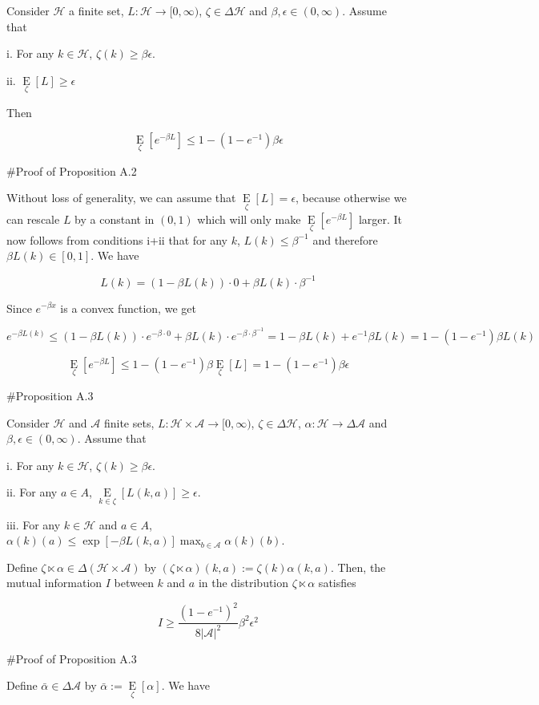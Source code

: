 \documentclass[a4paper]{article}
\newcommand{\E}[1]{\underset{#1}{\operatorname{E}}}
\newcommand{\Abs}[1]{\lvert #1 \rvert}
\newcommand{\A}{\mathcal{A}}
\newcommand{\Hy}{\mathcal{H}}
\begin{document}
Consider $\Hy$ a finite set, $L: \Hy \rightarrow [0,\infty)$, $\zeta \in \Delta\Hy$ and $\beta,\epsilon \in (0,\infty)$. Assume that

i. For any $k \in \Hy$, $\zeta(k) \geq \beta\epsilon$.

ii. $\E{\zeta}[L] \geq \epsilon$

Then

$$\E{\zeta}[e^{-\beta L}] \leq 1 - (1 - e^{-1})\beta\epsilon$$

\#Proof of Proposition A.2

Without loss of generality, we can assume that $\E\zeta[L] = \epsilon$, because otherwise we can rescale $L$ by a constant in $(0,1)$ which will only make $\E{\zeta}[e^{-\beta L}]$ larger. It now follows from conditions i+ii that for any $k$, $L(k) \leq \beta^{-1}$ and therefore $\beta L(k) \in [0,1]$. We have

$$L(k) = (1 - \beta L(k)) \cdot 0 + \beta L(k) \cdot \beta^{-1}$$

Since $e^{-\beta x}$ is a convex function, we get

$$e^{-\beta L(k)} \leq (1 - \beta L(k)) \cdot e^{-\beta \cdot 0} + \beta L(k) \cdot e^{-\beta \cdot \beta^{-1}} = 1 - \beta L(k) + e^{-1} \beta L(k) = 1-(1-e^{-1})\beta L(k)$$

$$\E\zeta[e^{-\beta L}] \leq 1-(1-e^{-1})\beta \E\zeta[L] = 1-(1-e^{-1})\beta\epsilon$$

\#Proposition A.3

Consider $\Hy$ and $\A$ finite sets, $L: \Hy \times \A \rightarrow [0,\infty)$, $\zeta \in \Delta\Hy$, $\alpha: \Hy \rightarrow \Delta\A$ and $\beta,\epsilon \in (0,\infty)$. Assume that

i. For any $k \in \Hy$, $\zeta(k) \geq \beta\epsilon$.

ii. For any $a \in A$, $\E{k \in \zeta}[L(k,a)] \geq \epsilon$.

iii. For any $k \in \Hy$ and $a \in A$, $\alpha(k)(a) \leq \exp[-\beta L(k,a)] \max_{b \in \A} \alpha(k)(b)$.

Define $\zeta \ltimes \alpha \in \Delta(\Hy \times \A)$ by $(\zeta \ltimes \alpha)(k,a):=\zeta(k)\alpha(k,a)$. Then,  the mutual information $I$ between $k$ and $a$ in the distribution $\zeta \ltimes \alpha$ satisfies

$$I \geq \frac{(1-e^{-1})^2}{8\Abs{\A}^2} \beta^2 \epsilon^2$$

\#Proof of Proposition A.3

Define $\bar{\alpha} \in \Delta\A$ by $\bar{\alpha}:=\E\zeta[\alpha]$. We have
\end{document}
